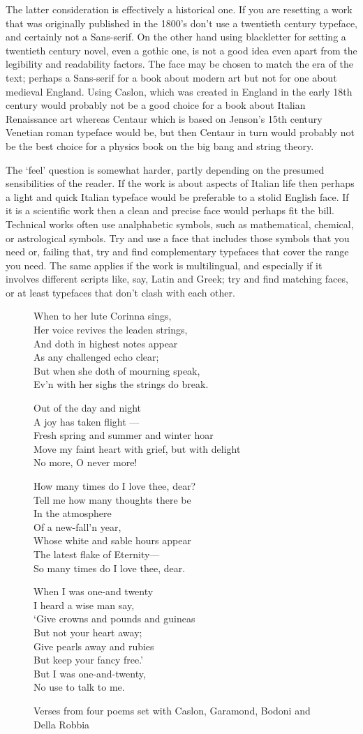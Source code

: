 \documentclass[10pt,letterpaper,extrafontsizes]{memoir}
\newcommand*{\thisfont}[5]{\fontencoding{T1}%
  \fontsize{#1}{#2}\fontfamily{#3}\fontseries{#4}\fontshape{#5}%
  \selectfont}
\newcommand*{\pickfont}[1]{\thisfont{12}{14}{#1}{m}{n}}
\newcommand*{\caslon}{\pickfont{5ca}}
\newcommand*{\garamond}{\pickfont{5gm}}
\newcommand*{\della}{\pickfont{5de}}
\newcommand*{\bodoni}{\pickfont{5bd}}
\renewcommand*{\pickfont}[1]{\thisfont{12}{14}{ppl}{m}{n}}
\newcommand*{\Shelley}{%
\hspace*{2em} Out of the day and night \\
\hspace*{2em} A joy has taken flight --- \\
Fresh spring and summer and winter hoar \\
\hspace*{1em} Move my faint heart with grief, but with delight \\
\hspace*{2em} No more, O never more!}
\newcommand*{\Beddoes}{%
How many times do I love thee, dear? \\
\hspace*{1em} Tell me how many thoughts there be \\
\hspace*{4em} In the atmosphere \\
\hspace*{4em} Of a new-fall'n year, \\
Whose white and sable hours appear \\
\hspace*{1em} The latest flake of Eternity--- \\
So many times do I love thee, dear.}
\newcommand*{\Campion}{%
When to her lute Corinna sings, \\
Her voice revives the leaden strings, \\
And doth in highest notes appear \\
As any challenged echo clear; \\
But when she doth of mourning speak, \\
Ev'n with her sighs the strings do break.}
\newcommand*{\Housman}{%
When I was one-and twenty \\
\hspace*{1em} I heard a wise man say, \\
`Give crowns and pounds and guineas \\
\hspace*{1em} But not your heart away; \\
Give pearls away and rubies \\
\hspace*{1em} But keep your fancy free.' \\
But I was one-and-twenty, \\
\hspace*{1em} No use to talk to me.}
\begin{document}
    The latter consideration is effectively a historical one. If you are
resetting a work that was originally published in the 1800's don't
use a twentieth century typeface, and certainly not a Sans-serif. On the
other hand using blackletter for setting a twentieth century novel, 
even a gothic one, is not a good idea even apart from the legibility and
readability factors.
    The face may be chosen to match the era of the text; perhaps a Sans-serif
for a book about modern art but not for one about medieval England. Using 
Caslon, which was created in England in the early 
18th century would 
probably not be a good choice for a book about Italian Renaissance art 
whereas Centaur which is based on Jenson's 
15th century Venetian roman
typeface would be, but then Centaur in turn would probably not be the
best choice for a physics book on the big bang and string theory. 

    The `feel' question is somewhat harder, partly depending on the 
presumed
sensibilities of the reader. If the work is about aspects of Italian
life then perhaps a light and quick Italian typeface would be 
preferable to a stolid English face. If it is a scientific work then
a clean and precise face would perhaps fit the bill. Technical
works often use analphabetic symbols, such as mathematical, chemical, or 
astrological symbols. Try and use a face that includes those symbols
that you need or, failing that, try and find complementary typefaces
that cover the range you need. The same applies if the work is 
multilingual, and especially if it involves different scripts
like, say, Latin and Greek; try and find matching faces, or at least 
typefaces that don't clash with each other.


 

\begin{figure}
\begin{adjustwidth}{-0.05\textwidth}{-0.05\textwidth}
\centering
\begin{minipage}[t]{0.52\textwidth}\caslon
\Campion
\end{minipage}
\hfill
\begin{minipage}[t]{0.52\textwidth}\garamond
\Shelley
\end{minipage}

\vspace*{2\onelineskip}

\begin{minipage}[t]{0.52\textwidth}\bodoni
\Beddoes
\end{minipage}
\hfill
\begin{minipage}[t]{0.52\textwidth}\della
\Housman
\end{minipage}
\caption{Verses from four poems set with Caslon, Garamond, Bodoni and Della Robbia} \label{fig:poems1}
\end{adjustwidth}
\end{figure}
\end{document}
